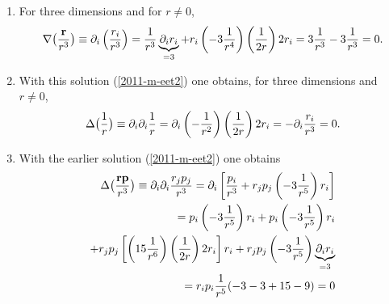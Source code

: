 {\begin{enumerate}
\item
For three dimensions and for $r \neq 0$,
\begin{equation}
\nabla \bigl({{\bf r} \over r^3} \bigr)\equiv
  \partial_i\left(\frac{r_i}{r^3}\right)=
  \frac{1}{r^3}\underbrace{\partial_i r_i}_{=3}+
  r_i\left(-3\frac{1}{r^4}\right)\left(\frac{1}{2r}\right)2r_i=
  3\frac{1}{r^3}-3\frac{1}{r^3}=0 .
\label{2011-m-eet2}
\end{equation}


\item  With this solution (\ref{2011-m-eet2}) one obtains, for three dimensions and $r \neq 0$,
\begin{equation}
\Delta \bigl({1 \over r} \bigr)\equiv
  \partial_i\partial_i\frac{1}{r}=\partial_i\left(-\frac{1}{r^2}\right)
  \left(\frac{1}{2r}\right)2r_i=-\partial_i\frac{r_i}{r^3}=0   .
\end{equation}


\item  With the earlier solution (\ref{2011-m-eet2}) one obtains
\begin{equation}
\begin{split}
\Delta \bigl({{\bf r} {\bf p} \over r^3} \bigr)\equiv
  \partial_i\partial_i\frac{r_jp_j}{r^3}=
    \partial_i
    \left[
      \frac{p_i}{r^3}+r_jp_j\left(-3\frac{1}{r^5}\right)r_i
    \right] \\
  = p_i\left(-3\frac{1}{r^5}\right)r_i+
    p_i\left(-3\frac{1}{r^5}\right)r_i \\
   +r_jp_j
    \left[
      \left(15\frac{1}{r^6}\right)
      \left(\frac{1}{2r}\right)2r_i
    \right]r_i+
    r_jp_j\left(-3\frac{1}{r^5}\right)
    \underbrace{\partial_i r_i}_{=3} \\
  = r_i p_i \frac{1}{r^5}(-3-3+15-9)=0
\end{split}
\end{equation}




\end{enumerate}}
